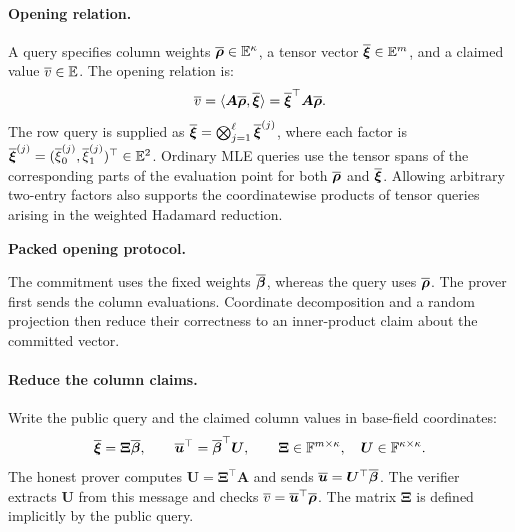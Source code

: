 \paragraph{Opening relation.}
A query specifies column weights
\(\overline{\bm\rho}\in\mathbb{E}^\kappa\), a tensor vector
\(\overline{\bm\xi}\in\mathbb{E}^m\), and a claimed value
\(\overline{v}\in\mathbb{E}\). The opening relation is:
\begin{equation}
    \overline{v}
    =\langle\bm A\overline{\bm\rho},\overline{\bm\xi}\rangle
    =\overline{\bm\xi}^{\top}\bm A\overline{\bm\rho}.
\label{eq:pcs-opening-relation}
\end{equation}
The row query is supplied as
\(\overline{\bm\xi}=\bigotimes_{j=1}^{\ell}\overline{\bm\xi}^{(j)}\),
where each factor is
\(\overline{\bm\xi}^{(j)}=(\overline{\xi}^{(j)}_0,
\overline{\xi}^{(j)}_1)^\top\in\mathbb{E}^2\).
Ordinary MLE queries use the tensor spans of the corresponding
parts of the evaluation point for both \(\overline{\bm\rho}\) and
\(\overline{\bm\xi}\). Allowing arbitrary two-entry factors also
supports the coordinatewise products of tensor queries arising
in the weighted Hadamard reduction.

\medskip\noindent\textbf{Packed opening protocol.}

The commitment uses the fixed weights \(\overline{\bm\beta}\), whereas
the query uses \(\overline{\bm\rho}\). The prover first sends the
column evaluations. Coordinate decomposition and a random
projection then reduce their correctness to an inner-product
claim about the committed vector.

\paragraph{Reduce the column claims.}
Write the public query and the claimed column values in base-field
coordinates:
\[
    \overline{\bm\xi}=\bm\Xi\overline{\bm\beta},
    \qquad
    \overline{\bm u}^{\top}=\overline{\bm\beta}^{\top}\bm U,
    \qquad
    \bm\Xi\in{\mathbb{F}}^{m\times\kappa},
    \quad
    \bm U\in{\mathbb{F}}^{\kappa\times\kappa}.
\]
The honest prover computes \(\bm U=\bm\Xi^\top\bm A\) and sends
\(\overline{\bm u}=\bm U^\top\overline{\bm\beta}\).
The verifier extracts \(\bm U\) from this message and checks
\(\overline{v}=\overline{\bm u}^{\top}\overline{\bm\rho}\).
The matrix \(\bm\Xi\) is defined implicitly by the public query.

